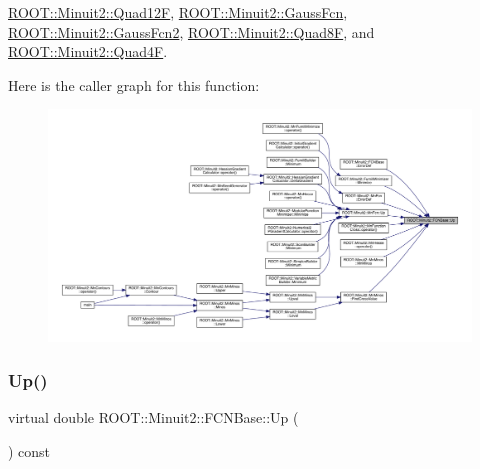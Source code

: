 \mbox{\hyperlink{classROOT_1_1Minuit2_1_1Quad12F_afbb216349fbceafc530845fe1cff5af4}{R\+O\+O\+T\+::\+Minuit2\+::\+Quad12F}}, \mbox{\hyperlink{classROOT_1_1Minuit2_1_1GaussFcn_a7e73468f853c287df3b5da240c3b5bb5}{R\+O\+O\+T\+::\+Minuit2\+::\+Gauss\+Fcn}}, \mbox{\hyperlink{classROOT_1_1Minuit2_1_1GaussFcn2_aef7172f9af50244bc9fce0c96cc21e81}{R\+O\+O\+T\+::\+Minuit2\+::\+Gauss\+Fcn2}}, \mbox{\hyperlink{classROOT_1_1Minuit2_1_1Quad8F_a8f241ff1340ea2184c7ee9247b8b200a}{R\+O\+O\+T\+::\+Minuit2\+::\+Quad8F}}, and \mbox{\hyperlink{classROOT_1_1Minuit2_1_1Quad4F_a19ebb5413722895a7635626cca02ebe9}{R\+O\+O\+T\+::\+Minuit2\+::\+Quad4F}}.

Here is the caller graph for this function\+:\nopagebreak
\begin{figure}[H]
\begin{center}
\leavevmode
\includegraphics[width=350pt]{dd/df4/classROOT_1_1Minuit2_1_1FCNBase_a04ef08ddad92ce8d89d498efbe021c39_icgraph}
\end{center}
\end{figure}
\mbox{\label{classROOT_1_1Minuit2_1_1FCNBase_a04ef08ddad92ce8d89d498efbe021c39}} 
\subsubsection{\texorpdfstring{Up()}{Up()}\hspace{0.1cm}{\footnotesize\ttfamily [2/2]}}
{\footnotesize\ttfamily virtual double R\+O\+O\+T\+::\+Minuit2\+::\+F\+C\+N\+Base\+::\+Up (\begin{DoxyParamCaption}{ }\end{DoxyParamCaption}) const\hspace{0.3cm}{\ttfamily [pure virtual]}}

